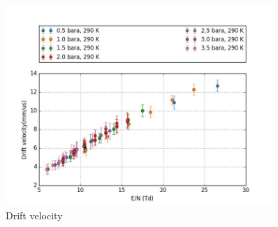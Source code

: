 \begin{center}
\begin{figure}[!htbp]
  \centering
  \includegraphics[width=0.9\textwidth,clip,trim={0 0 0 0}]
  {Figures/Ch10/drift_vel_cal_sum.jpg}
  \caption{Drift velocity}
  \label{fig: Drift velocity calibration}
\end{figure}
\end{center}


